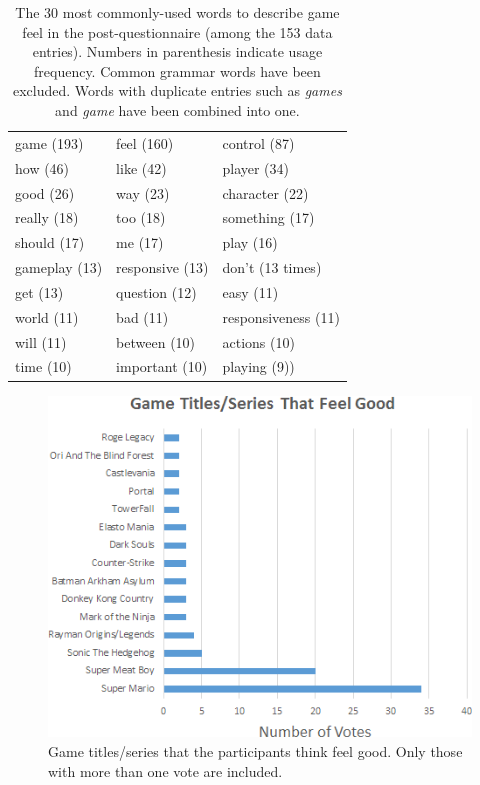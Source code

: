 \begin{table} \centering
\caption{The 30 most commonly-used words to describe game feel in the post-questionnaire (among the 153 data entries). Numbers in parenthesis indicate usage frequency. Common grammar words have been excluded. Words with duplicate entries such as \textit{games} and \textit{game} have been combined into one.}
\label{table:mostWordsPost_GF}
\begin{tabular}{lll}
\toprule
game (193) & feel (160) & control (87)\\
how (46) & like (42) & player (34)\\
good (26) & way (23) & character (22)\\
really (18) & too (18) & something (17)\\
should (17) & me (17) & play (16)\\
gameplay (13) & responsive (13) & don't (13 times)\\
get (13) & question (12) & easy (11)\\
world (11) & bad (11) & responsiveness (11)\\
will (11) & between (10) & actions (10)\\
time (10) & important (10) & playing (9))\\
\bottomrule
\end{tabular}
\end{table}

\begin{figure}[htbp]
\centering
\includegraphics[width=0.9\columnwidth]{Pics/good_games}
\caption{Game titles/series that the participants think feel good. Only those with more than one vote are included.}
\label{fig:good_games}
\end{figure}